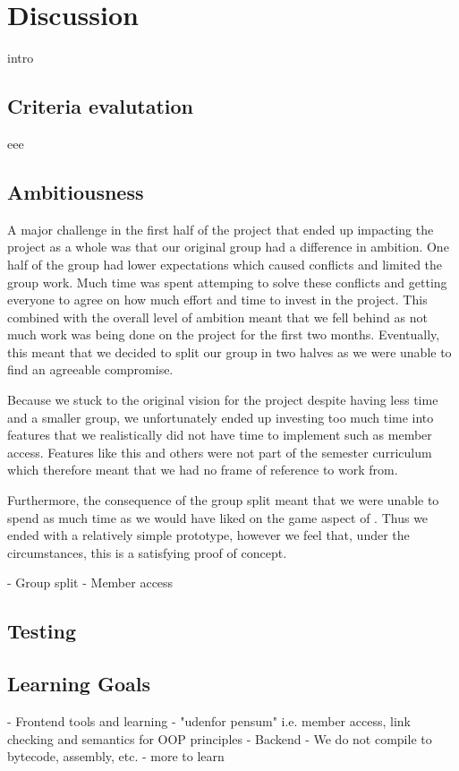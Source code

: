 \chapter{Discussion}
intro 

\section{Criteria evalutation}
eee

\section{Ambitiousness}
A major challenge in the first half of the project that ended up impacting the project as a whole was that our original group had a difference in ambition. 
One half of the group had lower expectations which caused conflicts and limited the group work.
Much time was spent attemping to solve these conflicts and getting everyone to agree on how much effort and time to invest in the project.
This combined with the overall level of ambition meant that we fell behind as not much work was being done on the project for the first two months. 
Eventually, this meant that we decided to split our group in two halves as we were unable to find an agreeable compromise.

Because we stuck to the original vision for the project despite having less time and a smaller group, we unfortunately ended up investing too much time into features that we realistically did not have time to implement such as member access.
Features like this and others were not part of the semester curriculum which therefore meant that we had no frame of reference to work from.

Furthermore, the consequence of the group split meant that we were unable to spend as much time as we would have liked on the game aspect of \dazel{}. Thus we ended with a relatively simple prototype, however we feel that, under the circumstances, this is a satisfying proof of concept.


- Group split
- Member access

\section{Testing}

\section{Learning Goals}
- Frontend tools and learning
	- "udenfor pensum" i.e. member access, link checking and semantics for OOP principles
- Backend
	- We do not compile to bytecode, assembly, etc. - more to learn
